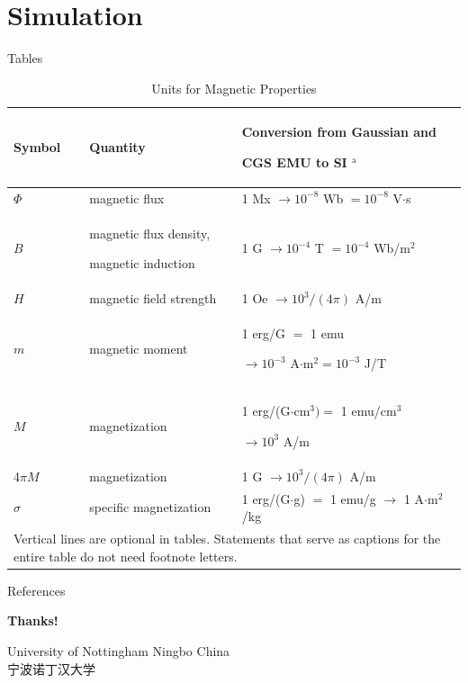 \documentclass[10pt,aspectratio=169,hyperref={colorlinks,citecolor=unncmid,urlcolor=unncmid,linkcolor=}]{beamer}
\theoremstyle{plain}
\begin{document}
\section{Simulation}

\begin{frame}{Tables}
  \begin{table}
    \caption{Units for Magnetic Properties}
    \label{table}
    \setlength{\parskip}{0pt}%
    \footnotesize
    \setlength{\tabcolsep}{3pt}
    \begin{tabular}{p{40pt}p{100pt}p{140pt}}
      \toprule
      {\bfseries Symbol}&
      {\bfseries Quantity}&
      {\bfseries Conversion from Gaussian and \par CGS EMU to SI $^{\mathrm{a}}$} \\
      \midrule
      $\Phi $&
      magnetic flux&
      1 Mx $\to 10^{-8}$ Wb $= 10^{-8}$ V$\cdot $s \\
      $B$&
      magnetic flux density, \par magnetic induction&
      1 G $\to 10^{-4}$ T $= 10^{-4}$ Wb/m$^{2}$ \\
      $H$&
      magnetic field strength&
      1 Oe $\to 10^{3}/(4\pi )$ A/m \\
      $m$&
      magnetic moment&
      1 erg/G $=$ 1 emu \par $\to 10^{-3}$ A$\cdot $m$^{2} = 10^{-3}$ J/T \\
      $M$&
      magnetization&
      1 erg/(G$\cdot $cm$^{3}) =$ 1 emu/cm$^{3}$ \par $\to 10^{3}$ A/m \\
      4$\pi M$&
      magnetization&
      1 G $\to 10^{3}/(4\pi )$ A/m \\
      $\sigma $&
      specific magnetization&
      1 erg/(G$\cdot $g) $=$ 1 emu/g $\to $ 1 A$\cdot $m$^{2}$/kg \\
      \bottomrule
      \multicolumn{3}{p{280pt}}{Vertical lines are optional in tables. Statements that serve as captions for
        the entire table do not need footnote letters. }
    \end{tabular}
    \label{tab1}
  \end{table}
\end{frame}

\begin{frame}{References}%
  \renewcommand*{\bibfont}{\footnotesize}
  
  
\end{frame}

\begin{frame}[plain]
  \begin{center}
    {\Huge\bfseries\color{unncblue} Thanks!}
    \vspace{1.2em}

    {\large\color{unncgrey} University of Nottingham Ningbo China}\\[0.4em]
    {\normalsize\color{unncgrey} 宁波诺丁汉大学}
  \end{center}
\end{frame}
\end{document}
